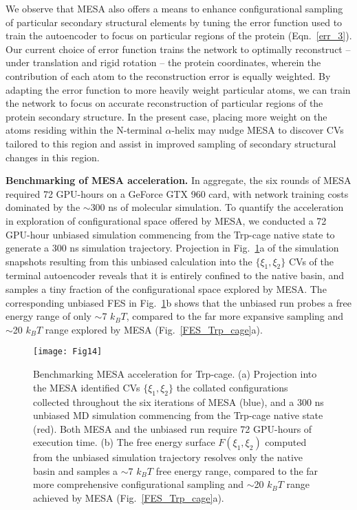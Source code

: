 \documentclass[12pt]{article}
\newcommand*{\blauw}[1]{#1}
\begin{document}
We observe that MESA also offers a means to enhance configurational sampling of particular secondary structural elements by tuning the error function used to train the autoencoder to focus on particular regions of the protein (\blauw{Eqn.~\ref{err_3}}). Our current choice of error function trains the network to optimally reconstruct -- under translation and rigid rotation -- the protein coordinates, wherein the contribution of each atom to the reconstruction error is equally weighted. By adapting the error function to more heavily weight particular atoms, we can train the network to focus on accurate reconstruction of particular regions of the protein secondary structure. In the present case, placing more weight on the atoms residing within the N-terminal $\alpha$-helix may nudge MESA to discover CVs tailored to this region and assist in improved sampling of secondary structural changes in this region. 


\textbf{Benchmarking of MESA acceleration.} In aggregate, the six rounds of MESA required 72 GPU-hours on a GeForce GTX 960 card, with network training costs dominated by the $\sim$300 ns of molecular simulation. To quantify the acceleration in exploration of configurational space offered by MESA, we conducted a 72 GPU-hour unbiased simulation commencing from the Trp-cage native state to generate a 300 ns simulation trajectory. Projection in \blauw{Fig.~\ref{Trp_bench}a} of the simulation snapshots resulting from this unbiased calculation into the $\{\xi_1,\xi_2\}$ CVs of the terminal autoencoder reveals that it is entirely confined to the native basin, and samples a tiny fraction of the configurational space explored by MESA. The corresponding unbiased FES in \blauw{Fig.~\ref{Trp_bench}b} shows that the unbiased run probes a free energy range of only $\sim$7 $k_B T$, compared to the far more expansive sampling and $\sim$20 $k_B T$ range explored by MESA (\blauw{Fig.~\ref{FES_Trp_cage}a}).

\begin{figure}[ht!]
\begin{center}
\texttt{[image: Fig14]} 
\caption{Benchmarking MESA acceleration for Trp-cage. (a) Projection into the MESA identified CVs $\{\xi_1,\xi_2\}$ the collated configurations collected throughout the six iterations of MESA (blue), and a 300 ns unbiased MD simulation commencing from the Trp-cage native state (red). Both MESA and the unbiased run require 72 GPU-hours of execution time. (b) The free energy surface $F(\xi_1,\xi_2)$ computed from the unbiased simulation trajectory resolves only the native basin and samples a $\sim$7 $k_B T$ free energy range, compared to the far more comprehensive configurational sampling and $\sim$20 $k_B T$ range achieved by MESA (\blauw{Fig.~\ref{FES_Trp_cage}a}).}
\label{Trp_bench}
\end{center}
\end{figure}
\end{document}
